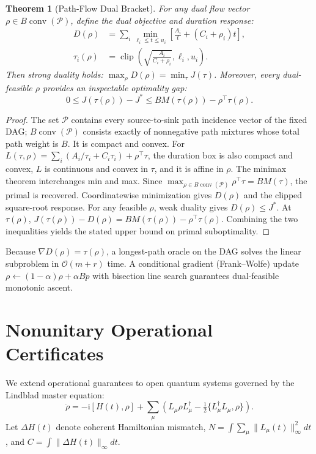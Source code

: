 \documentclass[10pt,letterpaper,journal]{IEEEtran}
\newtheorem{theorem}{Theorem}
\begin{document}
\begin{theorem}[Path-Flow Dual Bracket]\label{th:dual}
For any dual flow vector $\rho \in B \operatorname{conv}(\mathcal{P})$, define the dual objective and duration response:
\begin{align}
D(\rho) &= \sum_i \min_{\ell_i \le t \le u_i} \left[ \frac{A_i}{t} + (C_i + \rho_i)t \right],\\
\tau_i(\rho) &= \operatorname{clip}\left( \sqrt{\frac{A_i}{C_i + \rho_i}}, \ell_i, u_i \right).
\end{align}
Then strong duality holds: $\max_\rho D(\rho) = \min_\tau J(\tau)$. Moreover, every dual-feasible $\rho$ provides an inspectable optimality gap:
\begin{equation}
0 \le J(\tau(\rho)) - J^* \le B M(\tau(\rho)) - \rho^\top \tau(\rho).
\end{equation}
\end{theorem}
\begin{proof}
The set $\mathcal P$ contains every source-to-sink path incidence vector of the fixed DAG; $B\operatorname{conv}(\mathcal P)$ consists exactly of nonnegative path mixtures whose total path weight is $B$. It is compact and convex. For $L(\tau,\rho)=\sum_i(A_i/\tau_i+C_i\tau_i)+\rho^\top\tau$, the duration box is also compact and convex, $L$ is continuous and convex in $\tau$, and it is affine in $\rho$. The minimax theorem interchanges min and max. Since $\max_{\rho\in B\operatorname{conv}(\mathcal P)}\rho^\top\tau=B M(\tau)$, the primal is recovered. Coordinatewise minimization gives $D(\rho)$ and the clipped square-root response. For any feasible $\rho$, weak duality gives $D(\rho)\le J^*$. At $\tau(\rho)$, $J(\tau(\rho))-D(\rho)=B M(\tau(\rho))-\rho^\top\tau(\rho)$. Combining the two inequalities yields the stated upper bound on primal suboptimality.
\end{proof}

Because $\nabla D(\rho) = \tau(\rho)$, a longest-path oracle on the DAG solves the linear subproblem in $\mathcal{O}(m+r)$ time. A conditional gradient (Frank--Wolfe) update $\rho \leftarrow (1-\alpha)\rho + \alpha B p$ with bisection line search guarantees dual-feasible monotonic ascent.

\section{Nonunitary Operational Certificates}
We extend operational guarantees to open quantum systems governed by the Lindblad master equation:
\begin{equation}
\dot\rho = -\mathrm{i}[H(t), \rho] + \sum_\mu \left( L_\mu \rho L_\mu^\dagger - \tfrac{1}{2}\{L_\mu^\dagger L_\mu, \rho\} \right).
\end{equation}
Let $\Delta H(t)$ denote coherent Hamiltonian mismatch, $N = \int \sum_\mu \|L_\mu(t)\|_\infty^2 dt$, and $C = \int \|\Delta H(t)\|_\infty dt$.
\end{document}
